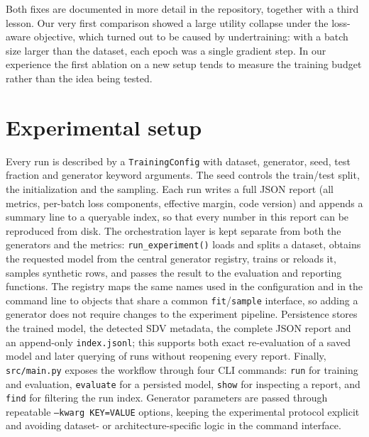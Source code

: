 \documentclass[11pt,a4paper]{article}
\begin{document}
Both fixes are documented in more detail in the repository, together with a
third lesson. Our very first comparison showed a large utility collapse under
the loss-aware objective, which turned out to be caused by undertraining: with
a batch size larger than the dataset, each epoch was a single gradient step.
In our experience the first ablation on a new setup tends to measure the
training budget rather than the idea being tested.

\section{Experimental setup}
\label{sec:setup}

Every run is described by a \texttt{TrainingConfig} with dataset, generator,
seed, test fraction and generator keyword arguments. The seed controls the
train/test split, the initialization and the sampling. Each run writes a full
JSON report (all metrics, per-batch loss components, effective margin, code
version) and appends a summary line to a queryable index, so that every number
in this report can be reproduced from disk. The orchestration layer is kept
separate from both the generators and the metrics: \texttt{run\_experiment()}
loads and splits a dataset, obtains the requested model from the central
generator registry, trains or reloads it, samples synthetic rows, and passes
the result to the evaluation and reporting functions. The registry maps the
same names used in the configuration and in the command line to objects that
share a common \texttt{fit}/\texttt{sample} interface, so adding a generator
does not require changes to the experiment pipeline. Persistence stores the
trained model, the detected SDV metadata, the complete JSON report and an
append-only \texttt{index.jsonl}; this supports both exact re-evaluation of a
saved model and later querying of runs without reopening every report. Finally,
\texttt{src/main.py} exposes the workflow through four CLI commands: \texttt{run}
for training and evaluation, \texttt{evaluate} for a persisted model,
\texttt{show} for inspecting a report, and \texttt{find} for filtering the run
index. Generator parameters are passed through repeatable \texttt{--kwarg
KEY=VALUE} options, keeping the experimental protocol explicit and avoiding
dataset- or architecture-specific logic in the command interface.
\end{document}
